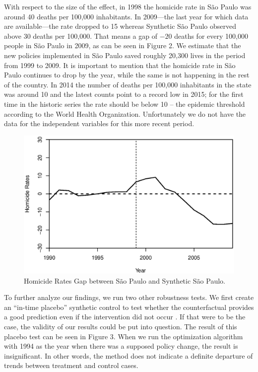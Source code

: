 \documentclass[a4paper,11pt]{article}
\begin{document}
With respect to the size of the effect, in 1998 the homicide rate in S\~{a}o Paulo was around 40 deaths per 100,000 inhabitants. In 2009---the last year for which data are available---the rate dropped to 15 whereas Synthetic S\~{a}o Paulo observed above 30 deaths per 100,000. That means a gap of $-20$ deaths for every 100,000 people in S\~{a}o Paulo in 2009, as can be seen in Figure 2. We estimate that the new policies implemented in S\~{a}o Paulo saved roughly 20,300 lives in the period from 1999 to 2009. It is important to mention that the homicide rate in S\~{a}o Paulo continues to drop by the year, while the same is not happening in the rest of the country. In 2014 the number of deaths per 100,000 inhabitants in the state was around 10 and the latest counts point to a record low in 2015; for the first time in the historic series the rate should be below 10 -- the epidemic threshold according to the World Health Organization. Unfortunately we do not have the data for the independent variables for this more recent period.

\newpage

\begin{figure}[htp!]
\begin{center}
\centerline{\includegraphics[width=.6\textwidth]{gaps.eps}}
\caption{Homicide Rates Gap between S\~{a}o Paulo and Synthetic S\~{a}o Paulo.}\label{gaps}
\end{center}
\end{figure}

To further analyze our findings, we run two other robustness tests. We first create an ``in-time placebo'' synthetic control to test whether the counterfactual provides a good prediction even if the intervention did not occur \citep{abadie2014}. If that were to be the case, the validity of our results could be put into question. The result of this placebo test can be seen in Figure 3. When we run the optimization algorithm with 1994 as the year when there was a supposed policy change, the result is insignificant. In other words, the method does not indicate a definite departure of trends between treatment and control cases. 
\end{document}
